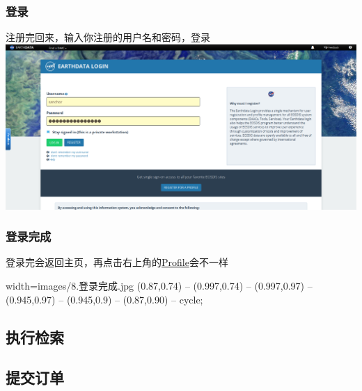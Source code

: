 \begin{frame}
    \frametitle{登录}
    注册完回来，输入你注册的用户名和密码，登录
    \includegraphics[width=\linewidth]{images/7.登录.png}
\end{frame}
\begin{frame}
    \frametitle{登录完成}
    登录完会返回主页，再点击右上角的\uline{Profile}会不一样
 \begin{annotationimage}{width=\linewidth}{images/8.登录完成.jpg}
     (0.87,0.74) -- (0.997,0.74) -- (0.997,0.97) --(0.945,0.97) -- (0.945,0.9) -- (0.87,0.90) -- cycle;
\end{annotationimage}
\subsection{执行检索}
\subsection{提交订单}
\end{frame}